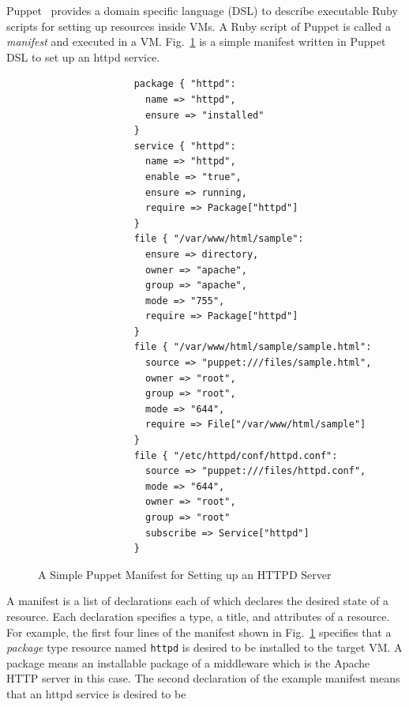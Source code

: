\documentclass[12pt]{report}
\begin{document}
Puppet~\cite{Puppet} provides a domain specific language (DSL) to
describe executable Ruby~\cite{Ruby} scripts for setting up resources inside
VMs. A Ruby script of Puppet is called a {\it manifest} and executed in a VM.
Fig.~\ref{fig:PuppetExample} is a simple manifest written in Puppet
DSL to set up an httpd service.
\begin{figure}
\small
\begin{verbatim}
                 package { "httpd":
                   name => "httpd",
                   ensure => "installed"
                 }
                 service { "httpd":
                   name => "httpd",
                   enable => "true",
                   ensure => running,
                   require => Package["httpd"]
                 }
                 file { "/var/www/html/sample":
                   ensure => directory,
                   owner => "apache",
                   group => "apache",
                   mode => "755",
                   require => Package["httpd"]
                 }
                 file { "/var/www/html/sample/sample.html":
                   source => "puppet:///files/sample.html",
                   owner => "root",
                   group => "root",
                   mode => "644",
                   require => File["/var/www/html/sample"]
                 }
                 file { "/etc/httpd/conf/httpd.conf":
                   source => "puppet:///files/httpd.conf",
                   mode => "644",
                   owner => "root",
                   group => "root"
                   subscribe => Service["httpd"]
                 }
\end{verbatim}
\normalsize
\vspace{-0.6cm}
\caption{A Simple Puppet Manifest for Setting up an HTTPD Server}
\label{fig:PuppetExample}
\end{figure}
A manifest is a list of declarations each of which declares the
desired state of a resource. Each declaration specifies a type, a
title, and attributes of a resource. For example, the first four lines
of the manifest shown in Fig.~\ref{fig:PuppetExample} specifies that a
{\it package} type resource named {\tt httpd} is desired to be installed to
the target VM. A package means an installable package of a middleware
which is the Apache HTTP server in this case.  The second declaration
of the example manifest means that an httpd service is desired to be
\end{document}
